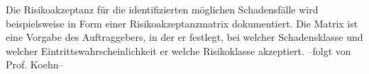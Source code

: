 Die Risikoakzeptanz für die identifizierten möglichen Schadensfälle wird beispielsweise in Form einer Risikoakzeptanzmatrix dokumentiert. Die Matrix ist eine Vorgabe des Auftraggebers, in der er festlegt, bei welcher Schadensklasse und welcher Eintrittswahrscheinlichkeit er welche Risikoklasse akzeptiert.
--folgt von Prof. Koehn--